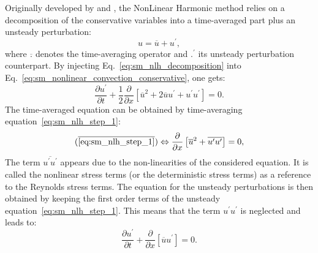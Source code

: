
Originally developed by \citet{He1998} and \citet{Ning1998},
the NonLinear Harmonic method
relies on a decomposition of the conservative variables into a
time-averaged part plus an unsteady perturbation:
\begin{equation}
	u = \overline{u} + u^\prime,
	\label{eq:sm_nlh_decomposition}
\end{equation}
where $\overline{.}$ denotes the time-averaging operator and
$.^\prime$ its unsteady perturbation counterpart.
By injecting Eq.~\ref{eq:sm_nlh_decomposition} into
Eq.~\ref{eq:sm_nonlinear_convection_conservative}, one gets:
\begin{equation}
	\frac{\partial u^\prime}{\partial t} + 
	\frac{1}{2}\frac{\partial}{\partial x} \left[
	\overline{u}^2 + 2 \overline{u} u^\prime + u^\prime u^\prime \right] = 
	0.
	\label{eq:sm_nlh_step_1}
\end{equation}
The time-averaged equation can be obtained by time-averaging
equation~\ref{eq:sm_nlh_step_1}:
\begin{equation}
	(\overline{\ref{eq:sm_nlh_step_1}})
	\Leftrightarrow
	\frac{\partial}{\partial x}
	\left[\overline{u}^2 + 
	\overline{u^\prime u^\prime}\right] =
	0,
	\label{eq:sm_nlh_step_2}
\end{equation}
The term $\overline{u^\prime u^\prime}$
appears due to the non-linearities of the considered equation. It
is called the nonlinear stress terms 
(or the deterministic stress terms) as a reference to 
the Reynolds stress terms. 
The equation for the unsteady perturbations is then obtained by keeping
the first order terms of the unsteady equation~\ref{eq:sm_nlh_step_1}.
This means that the term $u^\prime u^\prime$ is neglected and leads
to:
\begin{equation}
	\frac{\partial u^\prime}{\partial t} + 
	\frac{\partial}{\partial x} \left[\overline{u} u^\prime \right] = 
	0.
\end{equation}

